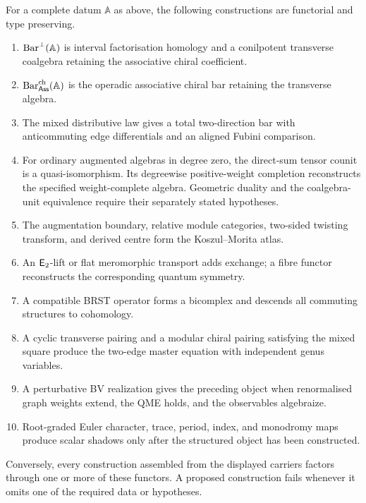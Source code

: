 \begin{theorem}\label{thm:definitive}
For a complete datum \(\mathbb A\) as above, the following constructions are functorial and type preserving.
\begin{enumerate}
\item \(\operatorname{Bar}^\perp(\mathbb A)\) is interval factorisation homology and a conilpotent transverse coalgebra retaining the associative chiral coefficient.
\item \(\operatorname{Bar}^{\mathrm{ch}}_{\mathsf{Ass}}(\mathbb A)\) is the operadic associative chiral bar retaining the transverse algebra.
\item The mixed distributive law gives a total two-direction bar with anticommuting edge differentials and an aligned Fubini comparison.
\item For ordinary augmented algebras in degree zero, the direct-sum tensor counit is a quasi-isomorphism. Its degreewise positive-weight completion reconstructs the specified weight-complete algebra. Geometric duality and the coalgebra-unit equivalence require their separately stated hypotheses.
\item The augmentation boundary, relative module categories, two-sided twisting transform, and derived centre form the Koszul--Morita atlas.
\item An \(\mathsf E_2\)-lift or flat meromorphic transport adds exchange; a fibre functor reconstructs the corresponding quantum symmetry.
\item A compatible BRST operator forms a bicomplex and descends all commuting structures to cohomology.
\item A cyclic transverse pairing and a modular chiral pairing satisfying the mixed square produce the two-edge master equation with independent genus variables.
\item A perturbative BV realization gives the preceding object when renormalised graph weights extend, the QME holds, and the observables algebraize.
\item Root-graded Euler character, trace, period, index, and monodromy maps produce scalar shadows only after the structured object has been constructed.
\end{enumerate}
Conversely, every construction assembled from the displayed carriers factors
through one or more of these functors.  A proposed construction fails whenever
it omits one of the required data or hypotheses.
\end{theorem}
